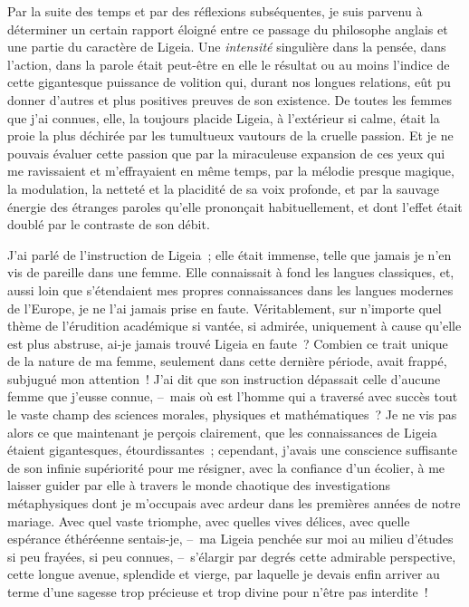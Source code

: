 \documentclass[french,twoside]{book} %
\begin{document}
Par la suite des temps et par des réflexions subséquentes, je suis parvenu à déterminer un certain rapport éloigné entre ce passage du philosophe anglais et une partie du caractère de Ligeia. Une \emph{intensité} singulière dans la pensée, dans l’action, dans la parole était peut-être en elle le résultat ou au moins l’indice de cette gigantesque puissance de volition qui, durant nos longues relations, eût pu donner d’autres et plus positives preuves de son existence. De toutes les femmes que j’ai connues, elle, la toujours placide Ligeia, à l’extérieur si calme, était la proie la plus déchirée par les tumultueux vautours de la cruelle passion. Et je ne pouvais évaluer cette passion que par la miraculeuse expansion de ces yeux qui me ravissaient et m’effrayaient en même temps, par la mélodie presque magique, la modulation, la netteté et la placidité de sa voix profonde, et par la sauvage énergie des étranges paroles qu’elle prononçait habituellement, et dont l’effet était doublé par le contraste de son débit.\par
J’ai parlé de l’instruction de Ligeia ; elle était immense, telle que jamais je n’en vis de pareille dans une femme. Elle connaissait à fond les langues classiques, et, aussi loin que s’étendaient mes propres connaissances dans les langues modernes de l’Europe, je ne l’ai jamais prise en faute. Véritablement, sur n’importe quel thème de l’érudition académique si vantée, si admirée, uniquement à cause qu’elle est plus abstruse, ai-je jamais trouvé Ligeia en faute ? Combien ce trait unique de la nature de ma femme, seulement dans cette dernière période, avait frappé, subjugué mon attention ! J’ai dit que son instruction dépassait celle d’aucune femme que j’eusse connue, – mais où est l’homme qui a traversé avec succès tout le vaste champ des sciences morales, physiques et mathématiques ? Je ne vis pas alors ce que maintenant je perçois clairement, que les connaissances de Ligeia étaient gigantesques, étourdissantes ; cependant, j’avais une conscience suffisante de son infinie supériorité pour me résigner, avec la confiance d’un écolier, à me laisser guider par elle à travers le monde chaotique des investigations métaphysiques dont je m’occupais avec ardeur dans les premières années de notre mariage. Avec quel vaste triomphe, avec quelles vives délices, avec quelle espérance éthéréenne sentais-je, – ma Ligeia penchée sur moi au milieu d’études si peu frayées, si peu connues, – s’élargir par degrés cette admirable perspective, cette longue avenue, splendide et vierge, par laquelle je devais enfin arriver au terme d’une sagesse trop précieuse et trop divine pour n’être pas interdite !\par
\end{document}

